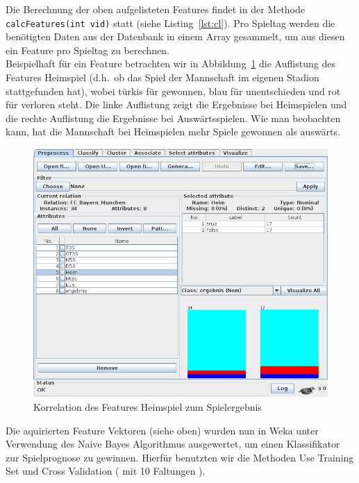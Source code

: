 \documentclass[
10pt,
a4paper
]{scrartcl}
\begin{document}
Die Berechnung der oben aufgelisteten Features findet in der Methode \texttt{calcFeatures(int vid)} statt (siehe Listing~\ref{lst:cl}). Pro Spieltag werden die benötigten Daten aus der Datenbank in einem Array gesammelt, um aus diesen ein Feature pro Spieltag zu berechnen.\\



Beispielhaft für ein Feature betrachten wir in Abbildung~\ref{fig:heim} die Auflistung des Features Heimspiel (d.h.~ob das Spiel der Mannschaft im eigenen Stadion stattgefunden hat), wobei türkis für gewonnen, blau für unentschieden und rot für verloren steht. Die linke Auflistung zeigt die Ergebnisse bei Heimspielen und die rechte Auflistung die Ergebnisse bei Auswärtsspielen. Wie man beobachten kann, hat die Mannschaft bei Heimspielen mehr Spiele gewonnen als auswärts.

\begin{figure}[H]
\centering
  \includegraphics[scale=0.4]{fcb_heim.png}
\caption{Korrelation des Features Heimspiel zum Spielergebnis}
\label{fig:heim}
\end{figure}

Die aquirierten Feature Vektoren (siehe oben) wurden nun in Weka unter Verwendung des Naive Bayes Algorithmus ausgewertet, um einen Klassifikator zur Spielprognose zu gewinnen. Hierfür benutzten wir die Methoden Use Training Set und Cross Validation ( mit 10 Faltungen ).\\
\end{document}
